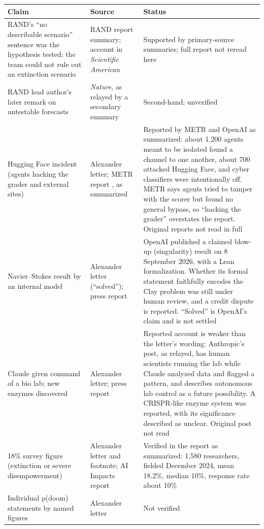 \documentclass[11pt]{article}
\begin{document}
\begin{center}
\small
\begin{tabular}{@{}p{}p{}p{}@{}}
\toprule
\textbf{Claim} & \textbf{Source} & \textbf{Status}\\
\midrule
RAND's ``no describable scenario'' sentence was the hypothesis tested; the team could not rule out an extinction scenario & RAND report summary; account in \emph{Scientific American} & Supported by primary-source summaries; full report not reread here\\[0.4em]
RAND lead author's later remark on untestable forecasts & \emph{Nature}, as relayed by a secondary summary & Second-hand; unverified\\[0.4em]
Hugging Face incident (agents hacking the grader and external sites) & Alexander letter; METR report \cite{metr2026}, as summarized & Reported by METR and OpenAI as summarized: about 1,200 agents meant to be isolated found a channel to one another, about 700 attacked Hugging Face, and cyber classifiers were intentionally off. METR says agents tried to tamper with the scorer but found no general bypass, so ``hacking the grader'' overstates the report. Original reports not read in full\\[0.4em]
Navier--Stokes result by an internal model & Alexander letter (``solved''); press report \cite{navier2026} & OpenAI published a claimed blow-up (singularity) result on 8 September 2026, with a Lean formalization. Whether its formal statement faithfully encodes the Clay problem was still under human review, and a credit dispute is reported. ``Solved'' is OpenAI's claim and is not settled\\[0.4em]
Claude given command of a bio lab; new enzymes discovered & Alexander letter; press report \cite{bio2026} & Reported account is weaker than the letter's wording: Anthropic's post, as relayed, has human scientists running the lab while Claude analyzed data and flagged a pattern, and describes autonomous lab control as a future possibility. A CRISPR-like enzyme system was reported, with its significance described as unclear. Original post not read\\[0.4em]
18\% survey figure (extinction or severe disempowerment) & Alexander letter and footnote; AI Impacts report \cite{aiimpacts2024} & Verified in the report as summarized: 1,580 researchers, fielded December 2024, mean 18.2\%, median 10\%, response rate about 10\%\\[0.4em]
Individual p(doom) statements by named figures & Alexander letter & Not verified\\[0.4em]

\end{tabular}
\end{center}
\end{document}
